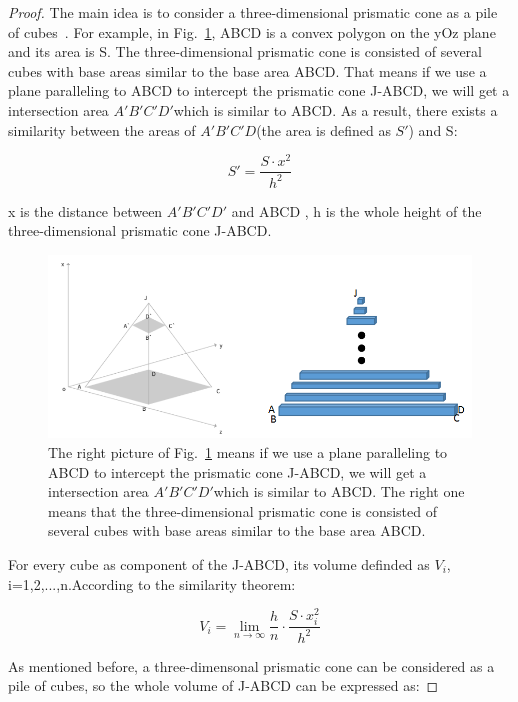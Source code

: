 \documentclass[runningheads]{llncs}
\begin{document}
\begin{proof}
The main idea is to consider a three-dimensional prismatic cone as a pile of cubes~\cite{ref_book1}. For example, in Fig.~\ref{FigR1_1}, ABCD is a convex polygon on the yOz plane and its area is S. The three-dimensional prismatic cone is consisted of several cubes with base areas similar to the base area ABCD. That means if we use a plane paralleling to ABCD to intercept the prismatic cone J-ABCD, we will get a intersection area ${A}'{B}'{C}'{D}'$which is similar to ABCD. As a result, there exists a similarity between the areas of ${A}'{B}'{C}'{D}$(the area is defined as ${S}'$) and S:

\begin{equation}\label{A1}
{S}'=\frac{S\cdot x^{2}}{h^{2}} 
\end{equation}

x is the distance between ${A}'{B}'{C}'{D}'$ and ABCD , h is the whole height of the three-dimensional prismatic cone J-ABCD.

\begin{figure}
\includegraphics[width=\textwidth]{Fig/FigR1_1.png}
\caption{The right picture of Fig.~\ref{FigR1_1} means if we use a plane paralleling to ABCD to intercept the prismatic cone J-ABCD, we will get a intersection area ${A}'{B}'{C}'{D}'$which is similar to ABCD. The right one means that the three-dimensional prismatic cone is consisted of several cubes with base areas similar to the base area ABCD.} \label{FigR1_1}
\end{figure}

For every cube as component of the J-ABCD, its volume definded as $V_{i}$, i=1,2,...,n.According to the similarity theorem: 

\begin{equation}\label{A2}
V_{i}=\lim \limits_{n \to \infty}\frac{h}{n}\cdot \frac{S\cdot x_{i}^{2}}{h^{2}}
\end{equation}

As mentioned before, a three-dimensonal prismatic cone can be considered as a pile of cubes, so the whole volume of J-ABCD can be expressed as:


\end{proof}
\end{document}
